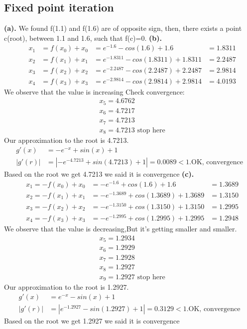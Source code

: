 \subsection{Fixed point iteration}
\textbf{(a).} 
We found f(1.1) and f(1.6) are of opposite sign, then, there exists a point c(root), between 1.1 and 1.6, such that f(c)=0.
\newpage
\textbf{(b).}
\[\begin{aligned}
    &x_1&=f(x_0)+x_0&=e^{-1.6}-cos(1.6)+1.6&=1.8311\\
    &x_2&=f(x_1)+x_1&=e^{-1.8311}-cos(1.8311)+1.8311&=2.2487\\
    &x_3&=f(x_2)+x_2&=e^{-2.2487}-cos(2.2487)+2.2487&=2.9814\\
    &x_4&=f(x_3)+x_3&=e^{-2.9814}-cos(2.9814)+2.9814&=4.0193
\end{aligned}\]
We observe that the value is increasing
Check convergence:
\[\begin{aligned}
    &x_5=4.6762\\
    &x_6=4.7217\\
    &x_7=4.7213\\
    &x_8=4.7213 \text{ stop here}
\end{aligned}\]
Our approximation to the root is 4.7213.
\[\begin{aligned}
    g'(x)&=-e^{-x}+sin(x)+1\\
    |g'(r)|&=|-e^{-4.7213}+sin(4.7213)+1|=0.0089<1. \text{OK, convergence}
\end{aligned}\]
Based on the root we get 4.7213 we said it is convergence
\newpage
\textbf{(c).}
\[\begin{aligned}
    &x_1=-f(x_0)+x_0&=-e^{-1.6}+cos(1.6)+1.6&=1.3689\\
    &x_2=-f(x_1)+x_1&=-e^{-1.3689}+cos(1.3689)+1.3689&=1.3150\\
    &x_3=-f(x_2)+x_2&=-e^{-1.3150}+cos(1.3150)+1.3150&=1.2995\\
    &x_4=-f(x_3)+x_3&=-e^{-1.2995}+cos(1.2995)+1.2995&=1.2948
\end{aligned}\]
We observe that the value is decreasing,But it's getting smaller and smaller.
\[\begin{aligned}
    &x_5=1.2934\\
    &x_6=1.2929\\
    &x_7=1.2928\\
    &x_8=1.2927\\
    &x_9=1.2927\text{ stop here}
\end{aligned}\]
Our approximation to the root is 1.2927.
\[\begin{aligned}
    g'(x)&=e^{-x}-sin(x)+1\\
    |g'(r)|&=|e^{-1.2927}-sin(1.2927)+1|=0.3129<1. \text{OK, convergence}
\end{aligned}\]
Based on the root we get 1.2927 we said it is convergence
\newpage
